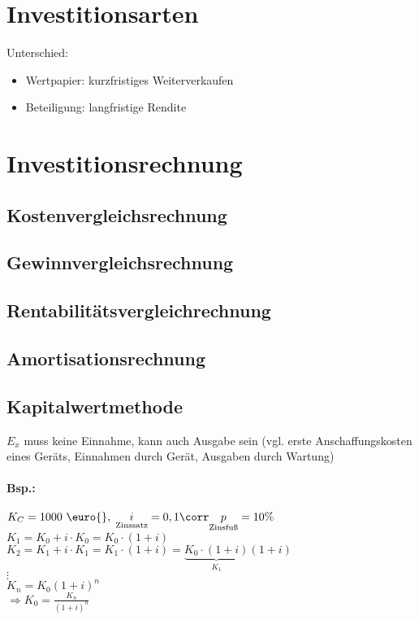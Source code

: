 \documentclass{scrreprt}
\begin{document}
\section{Investitionsarten}
Unterschied:
\begin{itemize}
\item Wertpapier: kurzfristiges Weiterverkaufen
\item Beteiligung: langfristige Rendite
\end{itemize}

\section{Investitionsrechnung}
\subsection{Kostenvergleichsrechnung}
\subsection{Gewinnvergleichsrechnung}

\subsection{Rentabilitätsvergleichrechnung}

\subsection{Amortisationsrechnung}

\subsection{Kapitalwertmethode}
$E_x$ muss keine Einnahme, kann auch Ausgabe sein (vgl. erste Anschaffungskosten eines Geräts, Einnahmen durch Gerät, Ausgaben durch Wartung)
\paragraph{Bsp.:}\parskp
$K_C=1000 \text{ \euro{}}, \; \underset{\text{Zinssatz}}{i}=0,1\corr \underset{\text{Zinsfuß}}{p}=10\%$\\
$K_1=K_0+i\cdot K_0=K_0\cdot(1+i)$\\
$K_2=K_1+i\cdot K_1=K_1\cdot (1+i)=\underbrace{K_0\cdot (1+i)}_{K_1}(1+i)$\\
$\vdots$\\
$K_n=K_0(1+i)^n$\\
$\Rightarrow K_0 = \frac{K_n}{(1+i)^n}$
\end{document}
